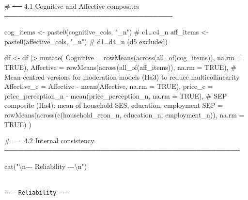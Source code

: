 \documentclass[
  letterpaper,
  DIV=11,
  numbers=noendperiod]{scrartcl}
\newenvironment{Shaded}{\begin{snugshade}}{\end{snugshade}}
\newcommand{\AttributeTok}[1]{\textcolor[rgb]{0.40,0.45,0.13}{#1}}
\newcommand{\CommentTok}[1]{\textcolor[rgb]{0.37,0.37,0.37}{#1}}
\newcommand{\ConstantTok}[1]{\textcolor[rgb]{0.56,0.35,0.01}{#1}}
\newcommand{\FunctionTok}[1]{\textcolor[rgb]{0.28,0.35,0.67}{#1}}
\newcommand{\NormalTok}[1]{\textcolor[rgb]{0.00,0.23,0.31}{#1}}
\newcommand{\OtherTok}[1]{\textcolor[rgb]{0.00,0.23,0.31}{#1}}
\newcommand{\SpecialCharTok}[1]{\textcolor[rgb]{0.37,0.37,0.37}{#1}}
\newcommand{\StringTok}[1]{\textcolor[rgb]{0.13,0.47,0.30}{#1}}
\begin{document}
\begin{Shaded}
\begin{Highlighting}[]
\CommentTok{\# ── 4.1  Cognitive and Affective composites ───────────────────────────────────}

\NormalTok{cog\_items }\OtherTok{\textless{}{-}} \FunctionTok{paste0}\NormalTok{(cognitive\_cols, }\StringTok{"\_n"}\NormalTok{)   }\CommentTok{\# c1…c4\_n}
\NormalTok{aff\_items }\OtherTok{\textless{}{-}} \FunctionTok{paste0}\NormalTok{(affective\_cols, }\StringTok{"\_n"}\NormalTok{)   }\CommentTok{\# d1…d4\_n  (d5 excluded)}

\NormalTok{df }\OtherTok{\textless{}{-}}\NormalTok{ df }\SpecialCharTok{|\textgreater{}}
  \FunctionTok{mutate}\NormalTok{(}
    \AttributeTok{Cognitive =} \FunctionTok{rowMeans}\NormalTok{(}\FunctionTok{across}\NormalTok{(}\FunctionTok{all\_of}\NormalTok{(cog\_items)), }\AttributeTok{na.rm =} \ConstantTok{TRUE}\NormalTok{),}
    \AttributeTok{Affective =} \FunctionTok{rowMeans}\NormalTok{(}\FunctionTok{across}\NormalTok{(}\FunctionTok{all\_of}\NormalTok{(aff\_items)), }\AttributeTok{na.rm =} \ConstantTok{TRUE}\NormalTok{),}
    \CommentTok{\# Mean{-}centred versions for moderation models (Ha3) to reduce multicollinearity}
    \AttributeTok{Affective\_c =}\NormalTok{ Affective       }\SpecialCharTok{{-}} \FunctionTok{mean}\NormalTok{(Affective,         }\AttributeTok{na.rm =} \ConstantTok{TRUE}\NormalTok{),}
    \AttributeTok{price\_c =}\NormalTok{ price\_perception\_n }\SpecialCharTok{{-}} \FunctionTok{mean}\NormalTok{(price\_perception\_n, }\AttributeTok{na.rm =} \ConstantTok{TRUE}\NormalTok{),}
    \CommentTok{\# SEP composite (Ha4): mean of household SES, education, employment}
    \AttributeTok{SEP =} \FunctionTok{rowMeans}\NormalTok{(}\FunctionTok{across}\NormalTok{(}\FunctionTok{c}\NormalTok{(household\_econ\_n, education\_n, employment\_n)), }\AttributeTok{na.rm =} \ConstantTok{TRUE}\NormalTok{)}
\NormalTok{  )}

\CommentTok{\# ── 4.2  Internal consistency ─────────────────────────────────────────────────}

\FunctionTok{cat}\NormalTok{(}\StringTok{"}\SpecialCharTok{\textbackslash{}n}\StringTok{{-}{-}{-} Reliability {-}{-}{-}}\SpecialCharTok{\textbackslash{}n}\StringTok{"}\NormalTok{)}
\end{Highlighting}
\end{Shaded}

\begin{verbatim}

--- Reliability ---
\end{verbatim}
\end{document}
